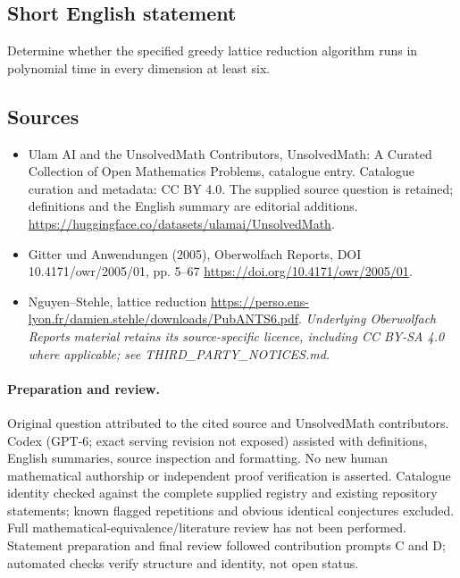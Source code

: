 \documentclass[11pt]{article}
\begin{document}
\subsection{Short English statement}
Determine whether the specified greedy lattice reduction algorithm runs in polynomial time in every dimension at least six.
\subsection{Sources}
\begin{itemize}
\item[\hypertarget{source:statement:1}{S1}] Ulam AI and the UnsolvedMath Contributors, UnsolvedMath: A Curated Collection of Open Mathematics Problems, catalogue entry. Catalogue curation and metadata: CC BY 4.0. The supplied source question is retained; definitions and the English summary are editorial additions.
\url{https://huggingface.co/datasets/ulamai/UnsolvedMath}.
\item[\hypertarget{source:statement:2}{S2}] Gitter und Anwendungen (2005), Oberwolfach Reports, DOI 10.4171/owr/2005/01, pp. 5--67
\url{https://doi.org/10.4171/owr/2005/01}.
\item[\hypertarget{source:statement:3}{S3}] Nguyen--Stehle, lattice reduction
\url{https://perso.ens-lyon.fr/damien.stehle/downloads/PubANTS6.pdf}.
\textit{Underlying Oberwolfach Reports material retains its source-specific licence, including CC BY-SA 4.0 where applicable; see THIRD\_PARTY\_NOTICES.md.}
\end{itemize}
\paragraph{Preparation and review.}
Original question attributed to the cited source and UnsolvedMath contributors. Codex (GPT-6; exact serving revision not exposed) assisted with definitions, English summaries, source inspection and formatting. No new human mathematical authorship or independent proof verification is asserted. Catalogue identity checked against the complete supplied registry and existing repository statements; known flagged repetitions and obvious identical conjectures excluded. Full mathematical-equivalence/literature review has not been performed. Statement preparation and final review followed contribution prompts C and D; automated checks verify structure and identity, not open status.
\label{end:statement}
\end{document}
